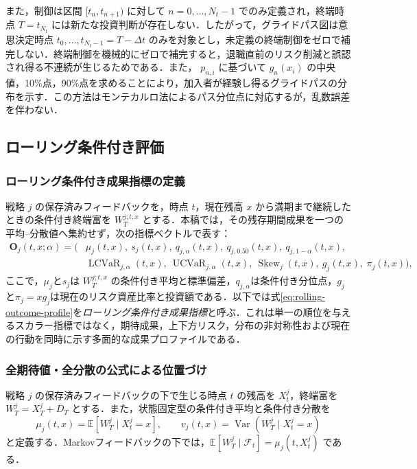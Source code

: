 \documentclass[10pt,a4paper]{article}
\theoremstyle{plain}
\theoremstyle{definition}
\newcommand{\E}{\mathbb{E}}
\DeclareMathOperator{\Var}{Var}
\begin{document}
また，制御は区間 $[t_n,t_{n+1})$ に対して $n=0,\ldots,N_t-1$ でのみ定義され，終端時点 $T=t_{N_t}$ には新たな投資判断が存在しない．したがって，グライドパス図は意思決定時点 $t_0,\ldots,t_{N_t-1}=T-\Delta t$ のみを対象とし，未定義の終端制御をゼロで補完しない．終端制御を機械的にゼロで補完すると，退職直前のリスク削減と誤認され得る不連続が生じるためである．また， $p_{n,i}$ に基づいて $g_n(x_i)$ の中央値，10\%点，90\%点を求めることにより，加入者が経験し得るグライドパスの分布を示す．この方法はモンテカルロ法によるパス分位点に対応するが，乱数誤差を伴わない．

\subsection{ローリング条件付き評価}
\label{sec:rolling}

\subsubsection{ローリング条件付き成果指標の定義}

戦略 $j$ の保存済みフィードバックを，時点 $t$，現在残高 $x$ から満期まで継続したときの条件付き終端富を $W_T^{j;t,x}$ とする．本稿では，その残存期間成果を一つの平均--分散値へ集約せず，次の指標ベクトルで表す：
\begin{equation}
\begin{split}
 \mathbf O_j(t,x;\alpha)=\bigl(&\mu_j(t,x),\ s_j(t,x),\ q_{j,\alpha}(t,x),\ q_{j,0.50}(t,x),\ q_{j,1-\alpha}(t,x),\\
 &\operatorname{LCVaR}_{j,\alpha}(t,x),\ \operatorname{UCVaR}_{j,\alpha}(t,x),\ \operatorname{Skew}_j(t,x),\ g_j(t,x),\ \pi_j(t,x)\bigr),
 \label{eq:rolling-outcome-profile}
\end{split}
\end{equation}
ここで，$\mu_j$と$s_j$は $W_T^{j;t,x}$ の条件付き平均と標準偏差，$q_{j,\alpha}$は条件付き分位点，$g_j$と$\pi_j=xg_j$は現在のリスク資産比率と投資額である．以下では式\eqref{eq:rolling-outcome-profile}を\emph{ローリング条件付き成果指標}と呼ぶ．これは単一の順位を与えるスカラー指標ではなく，期待成果，上下方リスク，分布の非対称性および現在の行動を同時に示す多面的な成果プロファイルである．

\subsubsection{全期待値・全分散の公式による位置づけ}

戦略 $j$ の保存済みフィードバックの下で生じる時点 $t$ の残高を $X_t^j$，終端富を $W_T^j=X_T^j+D_T$ とする．また，状態固定型の条件付き平均と条件付き分散を
\begin{equation}
  \mu_j(t,x)=\E\!\left[W_T^j\mid X_t^j=x\right],
  \qquad
  v_j(t,x)=\Var\!\left(W_T^j\mid X_t^j=x\right)
  \label{eq:rolling-conditional-moments}
\end{equation}
と定義する．Markovフィードバックの下では，$\E[W_T^j\mid\mathcal F_t]=\mu_j(t,X_t^j)$ である．
\end{document}
